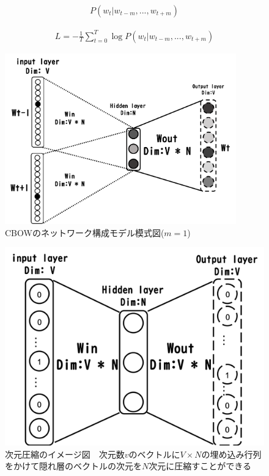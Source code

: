 \documentclass[a4j,11pt,report]{jsbook}
\begin{document}
\begin{equation}
  \label{cobw同時確率}
  \begin{array}{c}
    P(w_{t}|w_{t-m},...,w_{t+m})
  \end{array}
\end{equation}

\begin{equation}
  \label{cbow_loss}
  \begin{array}{c}
    L = -\frac{1}{T} \sum_{t = 0}^T \log P(w_{t}|w_{t-m},...,w_{t+m})
  \end{array}
\end{equation}

\begin{figure}[H]
 \centering
\includegraphics[width = 100mm]{image/CBOW_windowsize_1.png}
 \caption{CBOWのネットワーク構成モデル模式図($ m = 1$) }
 \label{fig:CBOWimage}
\end{figure}



\begin{figure}[H]
 \centering
\includegraphics[scale = 0.5]{image/CBOW_image.png}
 \caption{次元圧縮のイメージ図　次元数$v$のベクトルに$V \times N $の埋め込み行列をかけて隠れ層のベクトルの次元を$N$次元に圧縮すことができる}
 \label{fig:CBOWimage}
\end{figure}
\fi
\end{document}
